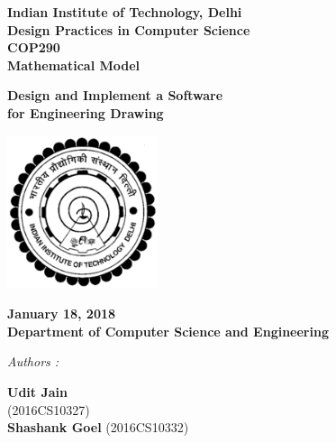 \documentclass[12pt]{report}
\begin{document}
\begin{center}
\LARGE{\textbf{Indian Institute of Technology, Delhi}}\\
\vspace{1cm}
\large{\textbf{Design Practices in Computer Science}}\\[5pt]
\large{\textbf{COP290}}\\[5pt]
\large{\textbf{Mathematical Model}}\\[5pt]
\vspace{0.5cm}

\large{\textbf{Design and Implement a Software }}
\large{\textbf{\\for Engineering Drawing}}\\[5pt]




\begin{center}
\includegraphics[height=4.5cm]{iitd.jpeg}
\end{center}
\vspace{0.2cm}

\textbf{January 18, 2018} \\
\textbf{Department of Computer Science and Engineering} \\


\vspace{2cm}


\begin{multicols*}{2}

\begin{flushleft}

\textit{Authors :\\ }


\textbf{Udit Jain} \\
(2016CS10327)\\
\textbf{Shashank Goel}
(2016CS10332)\\


\end{flushleft}
\end{multicols*}
\end{center}
\end{document}
